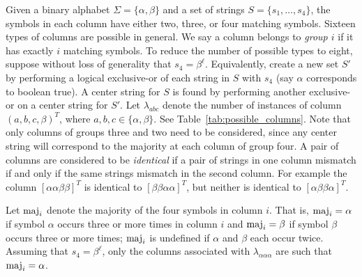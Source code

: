 Given a binary alphabet $\Sigma = \{\alpha, \beta \}$ and a set of strings $S=\{s_1, \ldots, s_4\}$, the symbols in each column have  either two, three, or four matching symbols. Sixteen types of columns are possible in general. We say a column belongs to {\em group $i$} if it has exactly $i$ matching symbols. To reduce the number of possible types to eight, suppose without loss of generality that $s_4 = \beta^{\ell}$. Equivalently, create a new set $S'$ by performing a logical exclusive-or of each string in $S$ with $s_4$ (say $\alpha$ corresponds to boolean true). A center string for $S$ is found by performing another exclusive-or on a center string for $S'$. Let $\lambda_{abc}$ denote the number of instances of column  $(a, b, c, \beta)^T$, where $a, b, c \in \{\alpha, \beta \}$. See Table~\ref{tab:possible_columns}. Note that only columns of groups three and two need to be considered, since any center string will correspond to the majority at each column of group four.  A pair of columns are considered to be {\em identical} if a pair of strings in one column mismatch if and only if the same strings mismatch in the second column.  For example the column $[  \alpha \alpha \beta \beta ]^T$ is identical to $[\beta \beta \alpha \alpha]^T$, but neither is identical to $[\alpha \beta \beta \alpha]^T$.  

Let $\operatorname{maj}_i$ denote the majority of the four symbols in column $i$. That is, $\operatorname{maj}_i = \alpha$ if symbol $\alpha$ occurs three or more times in column $i$ and $\operatorname{maj}_i = \beta$ if symbol $\beta$ occurs three or more times; $\operatorname{maj}_i$ is undefined if $\alpha$ and $\beta$ each occur twice.  Assuming that $s_4 = \beta^{\ell}$, only the columns associated with $\lambda_{\alpha\alpha\alpha}$ are such that $\operatorname{maj}_i = \alpha$.


